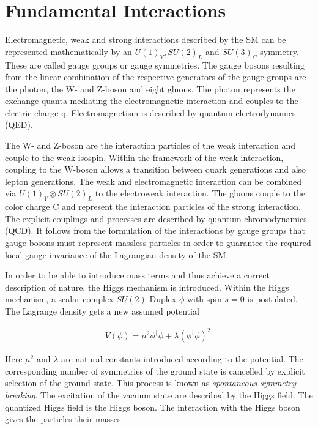 \documentclass[12pt, a4paper]{thesis}
\begin{document}
\section{Fundamental Interactions}
\label{sec:org8c44b2a}

Electromagnetic, weak and strong interactions described by the SM can
be represented mathematically by an \(U(1)_{Y}, SU(2)_{L}\) and
\(SU(3)_{C}\) symmetry. These are called gauge groups or gauge
symmetries. The gauge bosons resulting from the linear combination of
the respective generators of the gauge groups are the photon, the W-
and Z-boson and eight gluons. The photon represents the exchange
quanta mediating the electromagnetic interaction and couples to the
electric charge q. Electromagnetism is described by quantum
electrodynamics (QED).

The W- and Z-boson are the interaction particles of the weak
interaction and couple to the weak isospin. Within the framework of
the weak interaction, coupling to the W-boson allows a transition
between quark generations and also lepton generations. The weak and
electromagnetic interaction can be combined via \(U(1)_{Y} \otimes
SU(2)_{L}\) to the electroweak interaction. The gluons couple to the
color charge C and represent the interaction particles of the strong
interaction. The explicit couplings and processes are described by
quantum chromodynamics (QCD).  It follows from the formulation of the
interactions by gauge groups that gauge bosons must represent massless
particles in order to guarantee the required local gauge invariance of
the Lagrangian density of the SM.

In order to be able to introduce mass terms and thus achieve a correct
description of nature, the Higgs mechanism is introduced.  Within the
Higgs mechanism, a scalar complex $SU(2)$ Duplex $\phi$ with spin
$s=0$ is postulated. The Lagrange density gets a new assumed potential

\begin{align}
V(\phi) = \mu^2 \phi^ \dagger \phi + \lambda (\phi^\dagger \phi)^2.
\end{align}

Here $\mu^2$ and $\lambda$ are natural constants introduced according
to the potential. The corresponding number of symmetries of the ground
state is cancelled by explicit selection of the ground state. This
process is known as \emph{spontaneous symmetry breaking}. The
excitation of the vacuum state are described by the Higgs field. The
quantized Higgs field is the Higgs boson. The interaction with the
Higgs boson gives the particles their masses.
\end{document}
